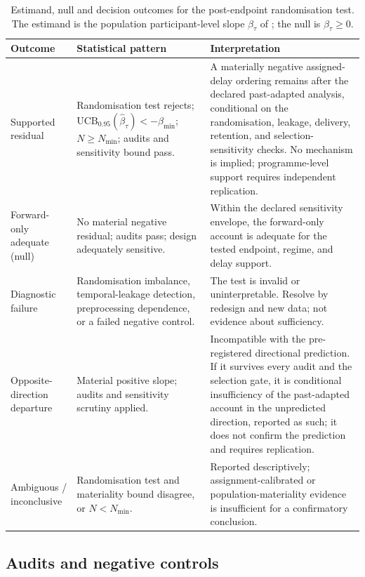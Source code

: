 \documentclass[11pt,a4paper]{article}
\theoremstyle{definition}
\newcommand{\UCB}{\mathrm{UCB}_{0.95}}
\begin{document}
\begin{table}[t]
\centering
\caption{Estimand, null and decision outcomes for the post-endpoint
randomisation test. The estimand is the population participant-level slope
\(\beta_\tau\) of ; the null is \(\beta_\tau\geq0\).}
\label{tab:decision}
\footnotesize
\begin{tabularx}{\textwidth}{@{}p{3.5cm}p{4.3cm}X@{}}
\toprule
\textbf{Outcome} & \textbf{Statistical pattern} & \textbf{Interpretation} \\
\midrule

Supported residual &
Randomisation test rejects; \(\UCB(\widehat{\beta}_\tau)<-\beta_{\min}\);
\(N\geq N_{\min}\); audits and sensitivity bound pass. &
A materially negative assigned-delay ordering remains after the declared past-adapted analysis, conditional on the randomisation, leakage, delivery, retention, and selection-sensitivity checks. No mechanism is implied; programme-level support requires independent replication. \\
Forward-only adequate (null) &
No material negative residual; audits pass; design adequately sensitive. &
Within the declared sensitivity envelope, the forward-only account is adequate
for the tested endpoint, regime, and delay support. \\
Diagnostic failure &
Randomisation imbalance, temporal-leakage detection, preprocessing dependence,
or a failed negative control. &
The test is invalid or uninterpretable. Resolve by redesign and new data; not
evidence about sufficiency. \\
Opposite-direction departure &
Material positive slope; audits and sensitivity scrutiny applied. &
Incompatible with the pre-registered directional prediction. If it survives every
audit and the selection gate, it is conditional insufficiency of the past-adapted
account in the unpredicted direction, reported as such; it does not confirm the
prediction and requires replication. \\
Ambiguous / inconclusive &
Randomisation test and materiality bound disagree, or \(N<N_{\min}\). &
Reported descriptively; assignment-calibrated or population-materiality evidence
is insufficient for a confirmatory conclusion. \\
\bottomrule
\end{tabularx}
\end{table}

\subsection{Audits and negative controls}
\label{sec:audits}
\end{document}
